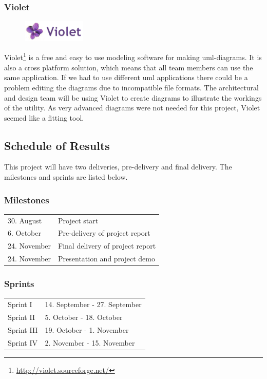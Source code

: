 \subsubsection{Violet}
\begin{figure}
	\vspace{-20pt}
	\includegraphics[width=3cm]{./planning/img/violet_logo}
	\vspace{-20pt}
\end{figure}
Violet\footnote{\url{http://violet.sourceforge.net/}} is a free
and easy to use modeling software for making \Gls{uml}-diagrams.
It is also a cross platform solution, which means that all team members can use
the same application. If we had to use different \Gls{uml} applications there could be a problem
editing the diagrams due to incompatible file formats.
The architectural and design team will be using Violet to create diagrams
to illustrate the workings of the utility. As very advanced diagrams were not needed for
this project, Violet seemed like a fitting tool.

\subsection{Schedule of Results}
This project will have two deliveries, pre-delivery and final delivery.
The milestones and sprints are listed below.

\subsubsection{Milestones}
\begin{tabular}{l l}
	30. August & Project start \\
	6. October & Pre-delivery of project report \\
	24. November & Final delivery of project report \\
	24. November & Presentation and project demo \\
\end{tabular}

\subsubsection{Sprints}
\begin{tabular}{l l}
	Sprint I & 14. September - 27. September \\
	Sprint II & 5. October - 18. October \\
	Sprint III & 19. October - 1. November  \\
	Sprint IV & 2. November - 15. November \\
\end{tabular}

